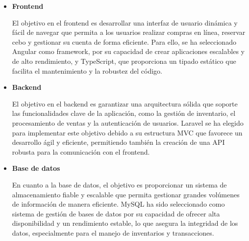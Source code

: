 \vspace{0.5cm}
\begin{itemize}
    \item \textbf{Frontend}

El objetivo en el frontend es desarrollar una interfaz de usuario dinámica y fácil de navegar que permita a los usuarios realizar compras en línea, reservar cebo y gestionar su cuenta de forma eficiente. Para ello, se ha seleccionado Angular como framework, por su capacidad de crear aplicaciones escalables y de alto rendimiento, y TypeScript, que proporciona un tipado estático que facilita el mantenimiento y la robustez del código.

\vspace{0.5cm}

    \item \textbf{Backend}

El objetivo en el backend es garantizar una arquitectura sólida que soporte las funcionalidades clave de la aplicación, como la gestión de inventario, el procesamiento de ventas y la autenticación de usuarios. Laravel se ha elegido para implementar este objetivo debido a su estructura MVC que favorece un desarrollo ágil y eficiente, permitiendo también la creación de una API robusta para la comunicación con el frontend.

\vspace{0.5cm}

 \item \textbf{Base de datos}
 
En cuanto a la base de datos, el objetivo es proporcionar un sistema de almacenamiento fiable y escalable que permita gestionar grandes volúmenes de información de manera eficiente. MySQL ha sido seleccionado como sistema de gestión de bases de datos por su capacidad de ofrecer alta disponibilidad y un rendimiento estable, lo que asegura la integridad de los datos, especialmente para el manejo de inventarios y transacciones.

\end{itemize}

